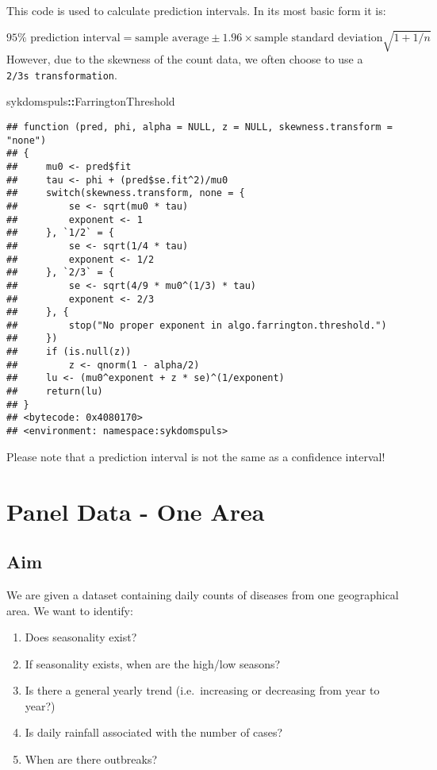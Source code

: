 \documentclass[]{book}
\newenvironment{Shaded}{\begin{snugshade}}{\end{snugshade}}
\newcommand{\OperatorTok}[1]{\textcolor[rgb]{0.81,0.36,0.00}{\textbf{#1}}}
\newcommand{\NormalTok}[1]{#1}
\providecommand{\tightlist}{%
  \setlength{\itemsep}{0pt}\setlength{\parskip}{0pt}}
\begin{document}
This code is used to calculate prediction intervals. In its most basic
form it is:

\[
95\% \text{ prediction interval} = \text{sample average} \pm 1.96 \times \text{sample standard deviation} \sqrt{ 1 + 1 / n}
\] However, due to the skewness of the count data, we often choose to
use a \texttt{2/3s\ transformation}.

\begin{Shaded}
\begin{Highlighting}[]
\NormalTok{sykdomspuls}\OperatorTok{::}\NormalTok{FarringtonThreshold}
\end{Highlighting}
\end{Shaded}

\begin{verbatim}
## function (pred, phi, alpha = NULL, z = NULL, skewness.transform = "none") 
## {
##     mu0 <- pred$fit
##     tau <- phi + (pred$se.fit^2)/mu0
##     switch(skewness.transform, none = {
##         se <- sqrt(mu0 * tau)
##         exponent <- 1
##     }, `1/2` = {
##         se <- sqrt(1/4 * tau)
##         exponent <- 1/2
##     }, `2/3` = {
##         se <- sqrt(4/9 * mu0^(1/3) * tau)
##         exponent <- 2/3
##     }, {
##         stop("No proper exponent in algo.farrington.threshold.")
##     })
##     if (is.null(z)) 
##         z <- qnorm(1 - alpha/2)
##     lu <- (mu0^exponent + z * se)^(1/exponent)
##     return(lu)
## }
## <bytecode: 0x4080170>
## <environment: namespace:sykdomspuls>
\end{verbatim}

Please note that a prediction interval is not the same as a confidence
interval!

\chapter{Panel Data - One Area}\label{panel-data---one-area}

\section{Aim}\label{aim}

We are given a dataset containing daily counts of diseases from one
geographical area. We want to identify:

\begin{enumerate}
\def\labelenumi{\arabic{enumi}.}
\tightlist
\item
  Does seasonality exist?
\item
  If seasonality exists, when are the high/low seasons?
\item
  Is there a general yearly trend (i.e.~increasing or decreasing from
  year to year?)
\item
  Is daily rainfall associated with the number of cases?
\item
  When are there outbreaks?
\end{enumerate}
\end{document}
